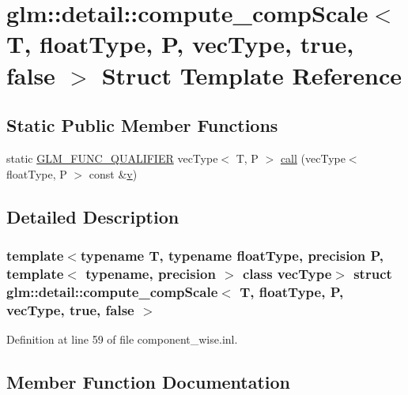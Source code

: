 \hypertarget{structglm_1_1detail_1_1compute__comp_scale_3_01_t_00_01float_type_00_01_p_00_01vec_type_00_01true_00_01false_01_4}{}\section{glm\+::detail\+::compute\+\_\+comp\+Scale$<$ T, float\+Type, P, vec\+Type, true, false $>$ Struct Template Reference}
\label{structglm_1_1detail_1_1compute__comp_scale_3_01_t_00_01float_type_00_01_p_00_01vec_type_00_01true_00_01false_01_4}
\subsection*{Static Public Member Functions}
\begin{DoxyCompactItemize}
\item 
static \mbox{\hyperlink{setup_8hpp_a33fdea6f91c5f834105f7415e2a64407}{G\+L\+M\+\_\+\+F\+U\+N\+C\+\_\+\+Q\+U\+A\+L\+I\+F\+I\+ER}} vec\+Type$<$ T, P $>$ \mbox{\hyperlink{structglm_1_1detail_1_1compute__comp_scale_3_01_t_00_01float_type_00_01_p_00_01vec_type_00_01true_00_01false_01_4_a36a82cd119e92db7893e7067e28e9c30}{call}} (vec\+Type$<$ float\+Type, P $>$ const \&\mbox{\hyperlink{glad_8h_a14cfbe2fc2234f5504618905b69d1e06}{v}})
\end{DoxyCompactItemize}


\subsection{Detailed Description}
\subsubsection*{template$<$typename T, typename float\+Type, precision P, template$<$ typename, precision $>$ class vec\+Type$>$\newline
struct glm\+::detail\+::compute\+\_\+comp\+Scale$<$ T, float\+Type, P, vec\+Type, true, false $>$}



Definition at line 59 of file component\+\_\+wise.\+inl.



\subsection{Member Function Documentation}
\mbox{\label{structglm_1_1detail_1_1compute__comp_scale_3_01_t_00_01float_type_00_01_p_00_01vec_type_00_01true_00_01false_01_4_a36a82cd119e92db7893e7067e28e9c30}} 
